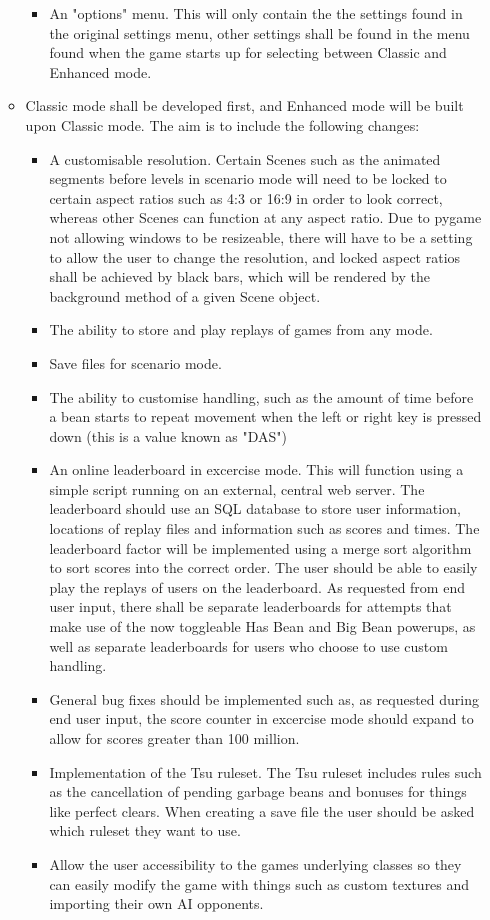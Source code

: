 \documentclass{article}
\begin{document}
\begin{itemize}
\begin{itemize}
\begin{itemize}
            \item An "options" menu. This will only contain the the settings found in the original settings menu, other settings shall be found in the menu found when the game starts up for selecting between Classic and Enhanced mode. 
        \end{itemize}
        \item Classic mode shall be developed first, and Enhanced mode will be built upon Classic mode. The aim is to include the following changes:
        \begin{itemize}
            \item A customisable resolution. Certain Scenes such as the animated segments before levels in scenario mode will need to be locked to certain aspect ratios such as 4:3 or 16:9 in order to look correct, whereas other Scenes can function at any aspect ratio. Due to pygame not allowing windows to be resizeable, there will have to be a setting to allow the user to change the resolution, and locked aspect ratios shall be achieved by black bars, which will be rendered by the background method of a given Scene object.
            \item The ability to store and play replays of games from any mode.
            \item Save files for scenario mode.
            \item The ability to customise handling, such as the amount of time before a bean starts to repeat movement when the left or right key is pressed down (this is a value known as "DAS")
            \item An online leaderboard in excercise mode. This will function using a simple script running on an external, central web server. The leaderboard should use an SQL database to store user information, locations of replay files and information such as scores and times. The leaderboard factor will be implemented using a merge sort algorithm to sort scores into the correct order. The user should be able to easily play the replays of users on the leaderboard. As requested from end user input, there shall be separate leaderboards for attempts that make use of the now toggleable Has Bean and Big Bean powerups, as well as separate leaderboards for users who choose to use custom handling.
            \item General bug fixes should be implemented such as, as requested during end user input, the score counter in excercise mode should expand to allow for scores greater than 100 million.
            \item Implementation of the Tsu ruleset. The Tsu ruleset includes rules such as the cancellation of pending garbage beans and bonuses for things like perfect clears. When creating a save file the user should be asked which ruleset they want to use.
            \item Allow the user accessibility to the games underlying classes so they can easily modify the game with things such as custom textures and importing their own AI opponents.
        \end{itemize}
    \end{itemize}
\end{itemize}
\end{document}
